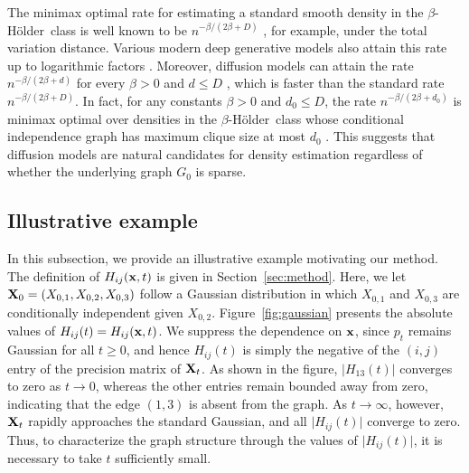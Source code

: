 \documentclass[11pt,a4paper,final]{article}
\numberwithin{equation}{section}
\theoremstyle{remark}
\newcommand{\bx}{{\bf x}}
\newcommand{\bX}{{\bf X}}
\newcommand{\Holder}{H\"{o}lder}
\begin{document}
The minimax optimal rate for estimating a standard smooth density in the $\beta$-\Holder \ class is well known to be $n^{-\beta/(2\beta + D)}$ \citep{tsybakov2008introduction, gine2016mathematical}, for example, under the total variation distance.
Various modern deep generative models also attain this rate up to logarithmic factors \citep{kwon2024minimax, oko2023diffusion, puchkin2024rates}.
Moreover, diffusion models can attain the rate $n^{-\beta/(2\beta+d)}$ for every $\beta > 0$ and $d \leq D$ \citep{kwon2026nonparametric, fan2025optimal}, which is faster than the standard rate $n^{-\beta/(2\beta+D)}$.
In fact, for any constants $\beta > 0$ and $d_0 \leq D$, the rate $n^{-\beta/(2\beta+ d_0)}$ is minimax optimal over densities in the $\beta$-\Holder \ class whose conditional independence graph has maximum clique size at most $d_0$ \citep{kwon2026nonparametric}.
This suggests that diffusion models are natural candidates for density estimation regardless of whether the underlying graph $G_{0}$ is sparse.




\subsection{Illustrative example}
\label{ssec:supp_illu}

In this subsection, we provide an illustrative example motivating our method.
The definition of $H_{ij}(\bx,t)$ is given in Section~\ref{sec:method}.
Here, we let $\bX_0 = (X_{0,1}, X_{0,2}, X_{0,3})$ follow a Gaussian distribution in which $X_{0,1}$ and $X_{0,3}$ are conditionally independent given $X_{0,2}$.
Figure~\ref{fig:gaussian} presents the absolute values of $H_{ij}(t) = H_{ij}(\bx,t)$.
We suppress the dependence on $\bx$, since $p_t$ remains Gaussian for all $t \geq 0$, and hence $H_{ij}(t)$ is simply the negative of the $(i,j)$ entry of the precision matrix of $\bX_t$.
As shown in the figure, $\vert H_{13}(t) \vert$ converges to zero as $t \to 0$, whereas the other entries remain bounded away from zero, indicating that the edge $(1,3)$ is absent from the graph.
As $t \rightarrow \infty$, however, $\bX_t$ rapidly approaches the standard Gaussian, and all $\vert H_{ij}(t) \vert$ converge to zero.
Thus, to characterize the graph structure through the values of $\vert H_{ij}(t) \vert$, it is necessary to take $t$ sufficiently small.
\end{document}
